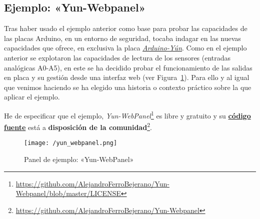 \subsection{Ejemplo: «Yun-Webpanel»}

Tras haber usado el ejemplo anterior como base para probar las capacidades de las placas Arduino, en un entorno de seguridad, tocaba indagar en las nuevas capacidades que ofrece, en exclusiva la placa \hyperref[tab:arduino-yun]{\textit{Arduino-Yún}}. Como en el ejemplo anterior se explotaron las capacidades de lectura de los sensores (entradas analógicas A0-A5), en este se ha decidido probar el funcionamiento de las salidas en placa y su gestión desde una interfaz web (ver Figura~\ref{fig:yunwebpanel}). Para ello y al igual que venimos haciendo se ha elegido una historia o contexto práctico sobre la que aplicar el ejemplo.

He de especificar que el ejemplo, \textit{Yun-WebPanel}\footnote{\url{https://github.com/AlejandroFerroBejerano/Yun-Webpanel/blob/master/LICENSE}} es libre y gratuito y su \href{https://github.com/AlejandroFerroBejerano/Yun-Webpanel}{\textbf{código fuente}} está a \textbf{disposición de la comunidad}\footnote{\url{https://github.com/AlejandroFerroBejerano/Yun-Webpanel}}. 

\begin{figure}[h]
\centering
\texttt{[image: /yun\_webpanel.png]}
\caption{Panel de ejemplo: «Yun-WebPanel»}
\label{fig:yunwebpanel}
\end{figure}


